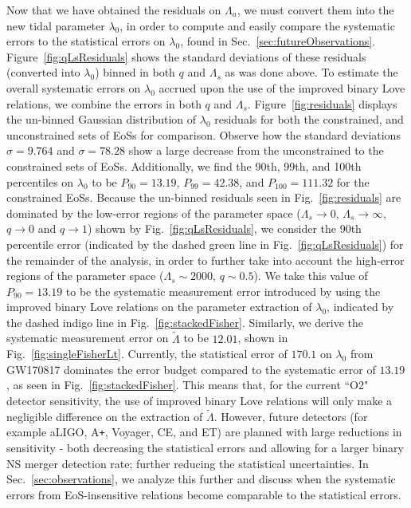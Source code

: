 \documentclass[prd,twocolumn,nofootinbib,superscriptaddress,amsmath,amssymb]{revtex4-1}
\begin{document}
Now that we have obtained the residuals on $\Lambda_a$, we must convert them into the new tidal parameter $\lambda_0$, in order to compute and easily compare the systematic errors to the statistical errors on $\lambda_0$, found in Sec.~\ref{sec:futureObservations}.
Figure~\ref{fig:qLsResiduals} shows the standard deviations of these residuals (converted into $\lambda_0$) binned in both $q$ and $\Lambda_s$ as was done above. 
To estimate the overall systematic errors on $\lambda_0$ accrued upon the use of the improved binary Love relations, we combine the errors in both $q$ and $\Lambda_s$.
Figure~\ref{fig:residuals} displays the un-binned Gaussian distribution of $\lambda_0$ residuals for both the constrained, and unconstrained sets of EoSs for comparison.
Observe how the standard deviations $\sigma=9.764$ and $\sigma=78.28$ show a large decrease from the unconstrained to the constrained sets of EoSs.
Additionally, we find the 90th, 99th, and 100th percentiles on $\lambda_0$ to be $P_{90}=13.19$, $P_{99}=42.38$, and $P_{100}=111.32$ for the constrained EoSs.
Because the un-binned residuals seen in Fig.~\ref{fig:residuals} are dominated by the low-error regions of the parameter space ($\Lambda_s \rightarrow 0$, $\Lambda_s \rightarrow \infty$, $q \rightarrow 0$ and $q \rightarrow 1$) shown by Fig.~\ref{fig:qLsResiduals}, we consider the 90th percentile error (indicated by the dashed green line in Fig.~\ref{fig:qLsResiduals}) for the remainder of the analysis, in order to further take into account the high-error regions of the parameter space ($\Lambda_s \sim 2000$, $q\sim0.5$).
We take this value of $P_{90}=13.19$ to be the systematic measurement error introduced by using the improved binary Love relations on the parameter extraction of $\lambda_0$, indicated by the dashed indigo line in Fig.~\ref{fig:stackedFisher}.
Similarly, we derive the systematic measurement error on $\tilde\Lambda$ to be $12.01$, shown in Fig.~\ref{fig:singleFisherLt}.
Currently, the statistical error of $170.1$ on $\lambda_0$ from GW170817 dominates the error budget compared to the systematic error of $13.19$, as seen in Fig.~\ref{fig:stackedFisher}.
This means that, for the current ``O2" detector sensitivity, the use of improved binary Love relations will only make a negligible difference on the extraction of $\tilde\Lambda$.
However, future detectors (for example aLIGO, A\texttt{+}, Voyager, CE, and ET) are planned with large reductions in sensitivity - both decreasing the statistical errors and allowing for a larger binary NS merger detection rate; further reducing the statistical uncertainties.
In Sec.~\ref{sec:observations}, we analyze this further and discuss when the systematic errors from EoS-insensitive relations become comparable to the statistical errors.
\end{document}
